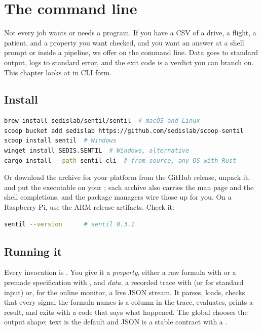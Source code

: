 \chapter{The command line}
\label{ch:cli}

Not every job wants or needs a program. If you have a CSV of a drive, a flight, a patient, and a property you want checked, and you want an answer at a shell prompt or inside a pipeline, we offer  on the command line. Data goes to standard output, logs to standard error, and the exit code is a verdict you can branch on. This chapter looks at \sentil{} in CLI form.

\section{Install}

\begin{lstlisting}[language=bash]
brew install sedislab/sentil/sentil  # macOS and Linux
scoop bucket add sedislab https://github.com/sedislab/scoop-sentil
scoop install sentil  # Windows
winget install SEDIS.SENTIL  # Windows, alternative
cargo install --path sentil-cli  # from source, any OS with Rust
\end{lstlisting}

Or download the archive for your platform from the GitHub release, unpack it, and put the  executable on your ; each archive also carries the man page and the shell completions, and the package managers wire those up for you. On a Raspberry Pi, use the ARM release artifacts. Check it:

\begin{lstlisting}[language=bash]
sentil --version      # sentil 0.3.1
\end{lstlisting}

\section{Running it}

Every invocation is . You give it a \emph{property}, either a raw formula with  or a premade specification with , and \emph{data}, a recorded trace with  (or \code{-} for standard input) or, for the online monitor, a live JSON stream. It parses, loads, checks that every signal the formula names is a column in the trace, evaluates, prints a result, and exits with a code that says what happened. The global  chooses the output shape; text is the default and JSON is a stable contract with a .

